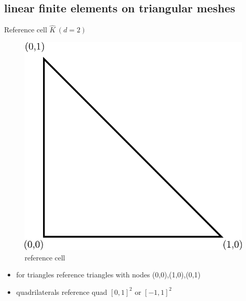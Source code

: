 \documentclass[english]{article}
\theoremstyle{definition}
\theoremstyle{remark}
\begin{document}
\subsection{linear finite elements on triangular meshes}
Reference cell $\hat K \ (d=2)$
\begin{figure}[H]
  \begin{center}
    \includegraphics[width=\textwidth]{figs/referenceCell.pdf}
  \end{center}
  \caption{reference cell}
  \label{reference-cell-figure}
\end{figure}
\begin{itemize}
\item for triangles reference triangles with nodes (0,0),(1,0),(0,1)
\item quadrilaterals reference quad $[0,1]^2$ or $[-1,1]^2$
\end{itemize}
\end{document}

